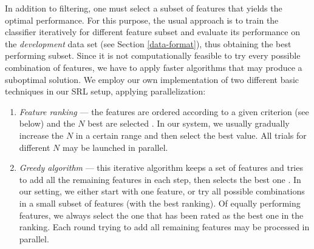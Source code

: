 \documentclass[12pt,notitlepage]{report}
\begin{document}
In addition to filtering, one must select a subset of features that yields the optimal performance. For this purpose, the usual approach is to train the classifier iteratively for different feature subset and evaluate its performance on the \emph{development} data set (see Section \ref{data-format}), thus obtaining the best performing subset. Since it is not computationally feasible to try every possible combination of features, we have to apply faster algorithms that may produce a suboptimal solution. We employ our own implementation of two different basic techniques in our SRL setup, applying parallelization:
\begin{enumerate}
    \item \emph{Feature ranking} --- the features are ordered according to a given criterion (see below) and the $N$ best are selected \citep[p. 251ff.]{manning08}. In our system, we usually gradually increase the $N$ in a certain range and then select the best value. All trials for different $N$ may be launched in parallel.
    \item \emph{Greedy algorithm} --- this iterative algorithm keeps a set of features and tries to add all the remaining features in each step, then selects the best one \citep{caruana94}. In our setting, we either start with one feature, or try all possible combinations in a small subset of features (with the best ranking). Of equally performing features, we always select the one that has been rated as the best one in the ranking. Each round trying to add all remaining features may be processed in parallel.
\end{enumerate}
\end{document}
